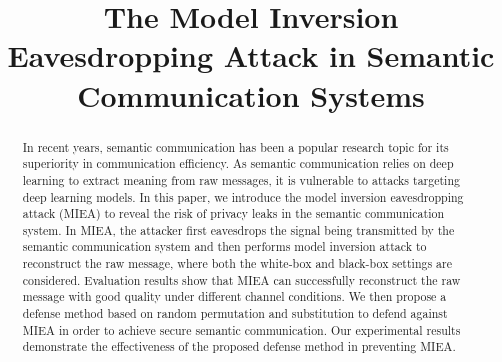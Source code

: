 \documentclass[conference]{IEEEtran}
\begin{document}
\title{The Model Inversion Eavesdropping Attack in Semantic Communication Systems}

\author{
}

\maketitle

\begin{abstract}
In recent years, semantic communication has been a popular research topic for its superiority in communication efficiency. As semantic communication relies on deep learning to extract meaning from raw messages, it is vulnerable to attacks targeting deep learning models. In this paper, we introduce the model inversion eavesdropping attack (MIEA) to reveal the risk of privacy leaks in the semantic communication system. In MIEA, the attacker first eavesdrops the signal being transmitted by the semantic communication system and then performs model inversion attack to reconstruct the raw message, where both the white-box and black-box settings are considered. Evaluation results show that MIEA can successfully reconstruct the raw message with good quality under different channel conditions. We then propose a defense method based on random permutation and substitution to defend against MIEA in order to achieve secure semantic communication. Our experimental results demonstrate the effectiveness of the proposed defense method in preventing MIEA.
\end{abstract}

\end{document}
